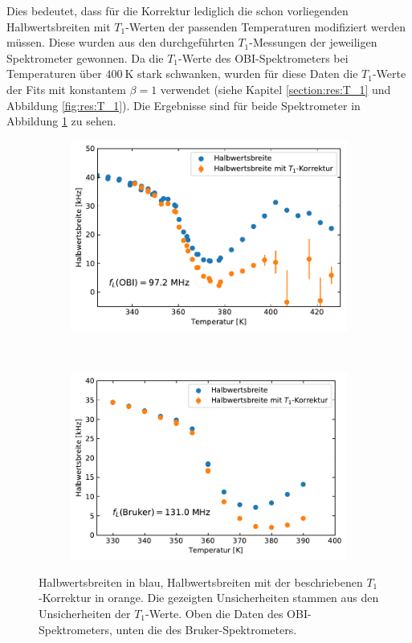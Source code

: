 Dies bedeutet, dass für die Korrektur lediglich die schon vorliegenden Halbwertsbreiten mit $T_1$-Werten der passenden Temperaturen modifiziert werden müssen. Diese wurden aus den durchgeführten $T_1$-Messungen der jeweiligen Spektrometer gewonnen. Da die $T_1$-Werte des OBI-Spektrometers bei Temperaturen über $\SI{400}{\kelvin}$ stark schwanken, wurden für diese Daten die $T_1$-Werte der Fits mit konstantem $\beta = 1$ verwendet (siehe Kapitel \ref{section:res:T_1} und Abbildung \ref{fig:res:T_1}). Die Ergebnisse sind für beide Spektrometer in Abbildung \ref{fig:res:spek_fwhm_t1} zu sehen.
\begin{figure}
	\centering
	\begin{subfigure}{\textwidth}
		\centering
		\includegraphics[width=.8\textwidth]{graphics/plot/fwhm_t1.pdf}
	\end{subfigure} \\
	\begin{subfigure}{\textwidth}
		\centering
		\includegraphics[width=.8\textwidth]{graphics/plot/fwhm_t1_bruker.pdf}
	\end{subfigure}
	\caption{Halbwertsbreiten in blau, Halbwertsbreiten mit der beschriebenen $T_1$-Korrektur in orange. Die gezeigten Unsicherheiten stammen aus den Unsicherheiten der $T_1$-Werte. Oben die Daten des OBI-Spektrometers, unten die des Bruker-Spektrometers.}
	\label{fig:res:spek_fwhm_t1}
\end{figure}

